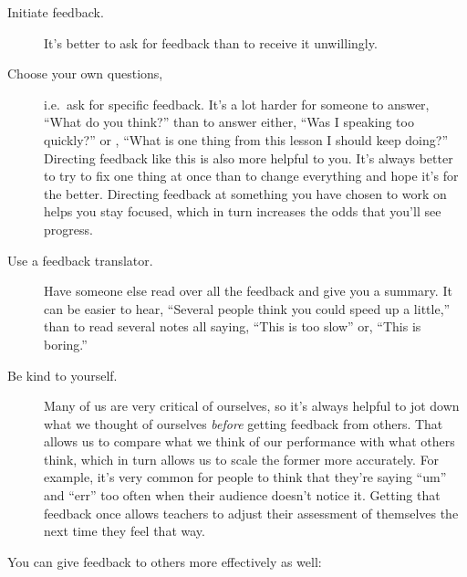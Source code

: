 \begin{description}

\item[Initiate feedback.]
  It's better to ask for feedback than to receive it unwillingly.

\item[Choose your own questions,]
  i.e.\ ask for specific feedback.
  It's a lot harder for someone to answer,
  ``What do you think?''
  than to answer either,
  ``Was I speaking too quickly?''
  or ,
  ``What is one thing from this lesson I should keep doing?''
  Directing feedback like this is also more helpful to you.
  It's always better to try to fix one thing at once
  than to change everything and hope it's for the better.
  Directing feedback at something you have chosen to work on helps you stay focused,
  which in turn increases the odds that you'll see progress.

\item[Use a feedback translator.]
  Have someone else read over all the feedback and give you a summary.
  It can be easier to hear,
  ``Several people think you could speed up a little,''
  than to read several notes all saying, ``This is too slow''
  or, ``This is boring.''

\item[Be kind to yourself.]
  Many of us are very critical of ourselves,
  so it's always helpful to jot down what we thought of ourselves
  \emph{before} getting feedback from others.
  That allows us to compare what we think of our performance
  with what others think,
  which in turn allows us to scale the former more accurately.
  For example,
  it's very common for people to think that they're saying ``um'' and ``err'' too often
  when their audience doesn't notice it.
  Getting that feedback once allows teachers to adjust their assessment of themselves
  the next time they feel that way.

\end{description}

\noindent
You can give feedback to others more effectively as well:

